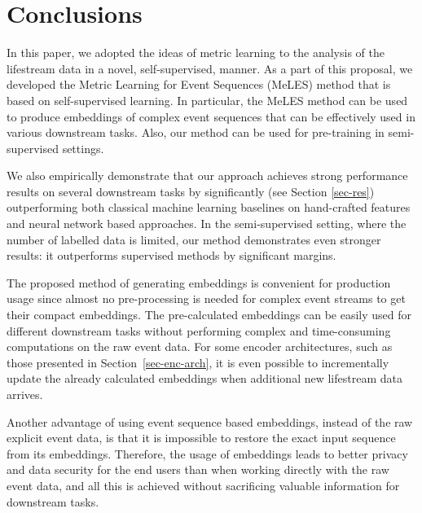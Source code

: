 \documentclass{article}
\begin{document}
\section{Conclusions} \label{sec-conclusions}

In this paper, we adopted the ideas of metric learning to the analysis of the lifestream data in a novel, self-supervised, manner. As a part of this proposal, we developed the Metric Learning for Event Sequences (MeLES) method that is based on self-supervised learning. 
In particular, the MeLES method can be used to produce embeddings of complex event sequences that can be effectively used in various downstream tasks. Also, our method can be used for pre-training in semi-supervised settings.

We also empirically demonstrate that our approach achieves strong performance results on several downstream tasks by significantly (see Section \ref{sec-res}) outperforming both classical machine learning baselines on hand-crafted features and neural network based approaches.
In the semi-supervised setting, where the number of labelled data is limited, our method demonstrates even stronger results: it outperforms supervised methods by significant margins.

The proposed method of generating embeddings is convenient for production usage since almost no pre-processing is needed for complex event streams to get their compact embeddings. The pre-calculated embeddings can be easily used for different downstream tasks without performing complex and time-consuming computations on the raw event data. For some encoder architectures, such as those presented in Section~\ref{sec-enc-arch}, it is even possible to incrementally update the already calculated embeddings when additional new lifestream data arrives.

Another advantage of using event sequence based embeddings, instead of the raw explicit event data, is that it is impossible to restore the exact input sequence from its embeddings. Therefore, the usage of embeddings leads to better privacy and data security for the end users than when working directly with the raw event data, and all this is achieved without sacrificing valuable information for downstream tasks.



\end{document}
